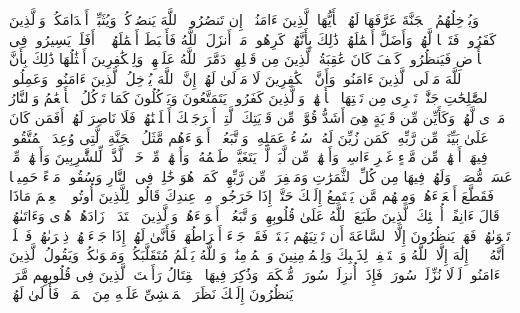 \startbuffer[\q:47:6]
وَیُدۡخِلُهُمُ ٱلۡجَنَّةَ عَرَّفَهَا لَهُمۡ%
\stopbuffer%
\startbuffer[\q:47:7]
یَٰۤأَیُّهَا ٱلَّذِینَ ءَامَنُوۤا۟ إِن تَنصُرُوا۟ ٱللَّهَ یَنصُرۡكُمۡ وَیُثَبِّتۡ أَقۡدَامَكُمۡ%
\stopbuffer%
\startbuffer[\q:47:8]
وَٱلَّذِینَ كَفَرُوا۟ فَتَعۡسࣰا لَّهُمۡ وَأَضَلَّ أَعۡمَٰلَهُمۡ%
\stopbuffer%
\startbuffer[\q:47:9]
ذَٰلِكَ بِأَنَّهُمۡ كَرِهُوا۟ مَاۤ أَنزَلَ ٱللَّهُ فَأَحۡبَطَ أَعۡمَٰلَهُمۡ%
\stopbuffer%
\startbuffer[\q:47:10]
۞ أَفَلَمۡ یَسِیرُوا۟ فِی ٱلۡأَرۡضِ فَیَنظُرُوا۟ كَیۡفَ كَانَ عَٰقِبَةُ ٱلَّذِینَ مِن قَبۡلِهِمۡۖ دَمَّرَ ٱللَّهُ عَلَیۡهِمۡۖ وَلِلۡكَٰفِرِینَ أَمۡثَٰلُهَا%
\stopbuffer%
\startbuffer[\q:47:11]
ذَٰلِكَ بِأَنَّ ٱللَّهَ مَوۡلَى ٱلَّذِینَ ءَامَنُوا۟ وَأَنَّ ٱلۡكَٰفِرِینَ لَا مَوۡلَىٰ لَهُمۡ%
\stopbuffer%
\startbuffer[\q:47:12]
إِنَّ ٱللَّهَ یُدۡخِلُ ٱلَّذِینَ ءَامَنُوا۟ وَعَمِلُوا۟ ٱلصَّٰلِحَٰتِ جَنَّٰتࣲ تَجۡرِی مِن تَحۡتِهَا ٱلۡأَنۡهَٰرُۖ وَٱلَّذِینَ كَفَرُوا۟ یَتَمَتَّعُونَ وَیَأۡكُلُونَ كَمَا تَأۡكُلُ ٱلۡأَنۡعَٰمُ وَٱلنَّارُ مَثۡوࣰى لَّهُمۡ%
\stopbuffer%
\startbuffer[\q:47:13]
وَكَأَیِّن مِّن قَرۡیَةٍ هِیَ أَشَدُّ قُوَّةࣰ مِّن قَرۡیَتِكَ ٱلَّتِیۤ أَخۡرَجَتۡكَ أَهۡلَكۡنَٰهُمۡ فَلَا نَاصِرَ لَهُمۡ%
\stopbuffer%
\startbuffer[\q:47:14]
أَفَمَن كَانَ عَلَىٰ بَیِّنَةࣲ مِّن رَّبِّهِۦ كَمَن زُیِّنَ لَهُۥ سُوۤءُ عَمَلِهِۦ وَٱتَّبَعُوۤا۟ أَهۡوَاۤءَهُم%
\stopbuffer%
\startbuffer[\q:47:15]
مَّثَلُ ٱلۡجَنَّةِ ٱلَّتِی وُعِدَ ٱلۡمُتَّقُونَۖ فِیهَاۤ أَنۡهَٰرࣱ مِّن مَّاۤءٍ غَیۡرِ ءَاسِنࣲ وَأَنۡهَٰرࣱ مِّن لَّبَنࣲ لَّمۡ یَتَغَیَّرۡ طَعۡمُهُۥ وَأَنۡهَٰرࣱ مِّنۡ خَمۡرࣲ لَّذَّةࣲ لِّلشَّٰرِبِینَ وَأَنۡهَٰرࣱ مِّنۡ عَسَلࣲ مُّصَفࣰّىۖ وَلَهُمۡ فِیهَا مِن كُلِّ ٱلثَّمَرَٰتِ وَمَغۡفِرَةࣱ مِّن رَّبِّهِمۡۖ كَمَنۡ هُوَ خَٰلِدࣱ فِی ٱلنَّارِ وَسُقُوا۟ مَاۤءً حَمِیمࣰا فَقَطَّعَ أَمۡعَاۤءَهُمۡ%
\stopbuffer%
\startbuffer[\q:47:16]
وَمِنۡهُم مَّن یَسۡتَمِعُ إِلَیۡكَ حَتَّىٰۤ إِذَا خَرَجُوا۟ مِنۡ عِندِكَ قَالُوا۟ لِلَّذِینَ أُوتُوا۟ ٱلۡعِلۡمَ مَاذَا قَالَ ءَانِفًاۚ أُو۟لَٰۤئِكَ ٱلَّذِینَ طَبَعَ ٱللَّهُ عَلَىٰ قُلُوبِهِمۡ وَٱتَّبَعُوۤا۟ أَهۡوَاۤءَهُمۡ%
\stopbuffer%
\startbuffer[\q:47:17]
وَٱلَّذِینَ ٱهۡتَدَوۡا۟ زَادَهُمۡ هُدࣰى وَءَاتَىٰهُمۡ تَقۡوَىٰهُمۡ%
\stopbuffer%
\startbuffer[\q:47:18]
فَهَلۡ یَنظُرُونَ إِلَّا ٱلسَّاعَةَ أَن تَأۡتِیَهُم بَغۡتَةࣰۖ فَقَدۡ جَاۤءَ أَشۡرَاطُهَاۚ فَأَنَّىٰ لَهُمۡ إِذَا جَاۤءَتۡهُمۡ ذِكۡرَىٰهُمۡ%
\stopbuffer%
\startbuffer[\q:47:19]
فَٱعۡلَمۡ أَنَّهُۥ لَاۤ إِلَٰهَ إِلَّا ٱللَّهُ وَٱسۡتَغۡفِرۡ لِذَنۢبِكَ وَلِلۡمُؤۡمِنِینَ وَٱلۡمُؤۡمِنَٰتِۗ وَٱللَّهُ یَعۡلَمُ مُتَقَلَّبَكُمۡ وَمَثۡوَىٰكُمۡ%
\stopbuffer%
\startbuffer[\q:47:20]
وَیَقُولُ ٱلَّذِینَ ءَامَنُوا۟ لَوۡلَا نُزِّلَتۡ سُورَةࣱۖ فَإِذَاۤ أُنزِلَتۡ سُورَةࣱ مُّحۡكَمَةࣱ وَذُكِرَ فِیهَا ٱلۡقِتَالُ رَأَیۡتَ ٱلَّذِینَ فِی قُلُوبِهِم مَّرَضࣱ یَنظُرُونَ إِلَیۡكَ نَظَرَ ٱلۡمَغۡشِیِّ عَلَیۡهِ مِنَ ٱلۡمَوۡتِۖ فَأَوۡلَىٰ لَهُمۡ%
